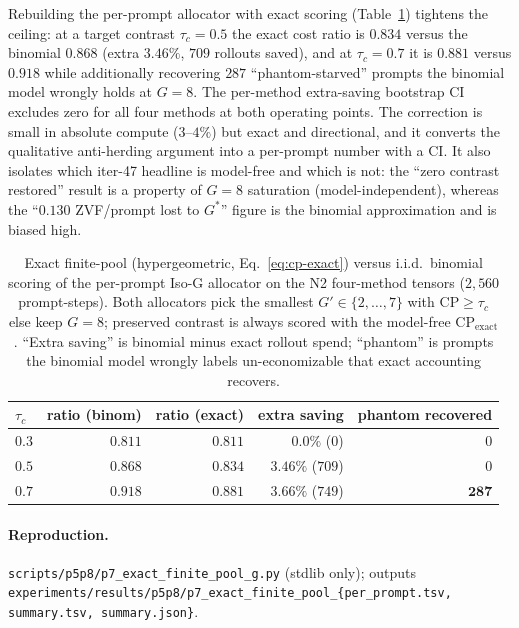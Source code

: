 Rebuilding the per-prompt allocator with exact scoring
(Table~\ref{tab:p7-exact-finite-pool}) tightens the ceiling: at a target
contrast $\tau_c{=}0.5$ the exact cost ratio is $0.834$ versus the
binomial $0.868$ (extra $3.46\%$, $709$ rollouts saved), and at
$\tau_c{=}0.7$ it is $0.881$ versus $0.918$ while additionally recovering
$287$ ``phantom-starved'' prompts the binomial model wrongly holds at
$G{=}8$. The per-method extra-saving bootstrap CI excludes zero for all
four methods at both operating points. The correction is small in
absolute compute ($3$--$4\%$) but exact and directional, and it converts
the qualitative anti-herding argument into a per-prompt number with a CI.
It also isolates which iter-47 headline is model-free and which is not:
the ``zero contrast restored'' result is a property of $G{=}8$ saturation
(model-independent), whereas the ``$0.130$ ZVF/prompt lost to $G^*$''
figure is the binomial approximation and is biased high.

\begin{table}[t]
\centering
\caption{Exact finite-pool (hypergeometric, Eq.~\eqref{eq:cp-exact})
versus i.i.d.\ binomial scoring of the per-prompt Iso-G allocator on the
N2 four-method tensors ($2{,}560$ prompt-steps). Both allocators pick the
smallest $G'\in\{2,\dots,7\}$ with $\mathrm{CP}\ge\tau_c$ else keep
$G{=}8$; preserved contrast is always scored with the model-free
$\mathrm{CP}_\text{exact}$. ``Extra saving'' is binomial minus exact
rollout spend; ``phantom'' is prompts the binomial model wrongly labels
un-economizable that exact accounting recovers.}
\label{tab:p7-exact-finite-pool}
\begin{tabular}{lrrrr}
\toprule
$\tau_c$ & ratio (binom) & ratio (exact) & extra saving & phantom recovered \\
\midrule
$0.3$ & $0.811$ & $0.811$ & $0.0\%$ ($0$) & $0$ \\
$0.5$ & $0.868$ & $\mathbf{0.834}$ & $\mathbf{3.46\%}$ ($709$) & $0$ \\
$0.7$ & $0.918$ & $\mathbf{0.881}$ & $\mathbf{3.66\%}$ ($749$) & $\mathbf{287}$ \\
\bottomrule
\end{tabular}
\end{table}

\paragraph{Reproduction.}
\texttt{scripts/p5p8/p7\_exact\_finite\_pool\_g.py} (stdlib only); outputs
\texttt{experiments/results/p5p8/p7\_exact\_finite\_pool\_\{per\_prompt.tsv,
summary.tsv, summary.json\}}.

